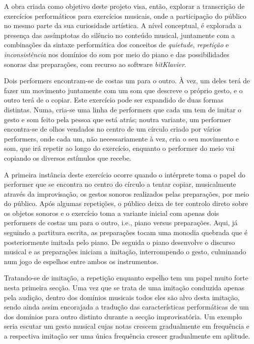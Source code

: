 \documentclass[../main.tex]{subfiles}
\begin{document}
A obra criada como objetivo deste projeto visa, então, explorar a transcrição de exercícios performáticos para exercícios musicais, onde a participação do público no mesmo parte da sua curiosidade artística. A nível conceptual, é explorada a presença das assímptotas do silêncio no conteúdo musical, juntamente com a combinações da sintaxe performática dos conceitos de \textsl{quietude}, \textsl{repetição} e \textsl{inconsistência} nos domínios do som por meio do piano e das possibilidades sonoras das preparações, com recurso ao software \textsl{bitKlavier}.




\begin{performex}
    Dois performers encontram-se de costas um para o outro. À vez, um deles terá de fazer um movimento juntamente com um som que descreve o próprio gesto, e o outro terá de o copiar. Este exercício pode ser expandido de duas formas distintas. Numa, cria-se uma linha de performers que cada um tem de imitar o gesto e som feito pela pessoa que está atrás; noutra variante, um performer encontra-se de olhos vendados no centro de um círculo criado por vários performers, onde cada um, não necessariamente à vez, cria o seu movimento e som, que irá repetir ao longo do exercício, enquanto o performer do meio vai copiando os diversos estímulos que recebe.
\end{performex}

A primeira instância deste exercício ocorre quando o intérprete toma o papel do performer que se encontra no centro do círculo a tentar copiar, musicalmente através da improvisação, os gestos sonoros realizados pelas preparações, por meio do público. Após algumas repetições, o público deixa de ter controlo direto sobre os objetos sonoros e o exercício toma a variante inicial com apenas dois performers de costas um para o outro, i.e., piano versus preparações. Aqui, já seguindo a partitura escrita, as preparações tocam uma monodia quebrada que é posteriormente imitada pelo piano. De seguida o piano desenvolve o discurso musical e as preparações iniciam a imitação, interrompendo o gesto, culminando num jogo de espelhos entre ambos os instrumentos.

Tratando-se de imitação, a repetição enquanto espelho tem um papel muito forte nesta primeira secção. Uma vez que se trata de uma imitação conduzida apenas pela audição, dentro dos domínios musicais todos eles são alvo desta imitação, sendo ainda assim encorajada a tradução das características performáticas de um dos domínios para outro distinto durante a secção improvisatória. Um exemplo seria escutar um gesto musical cujas notas crescem gradualmente em frequência e a respectiva imitação ser uma única frequência crescer gradualmente em aplitude.
\end{document}

